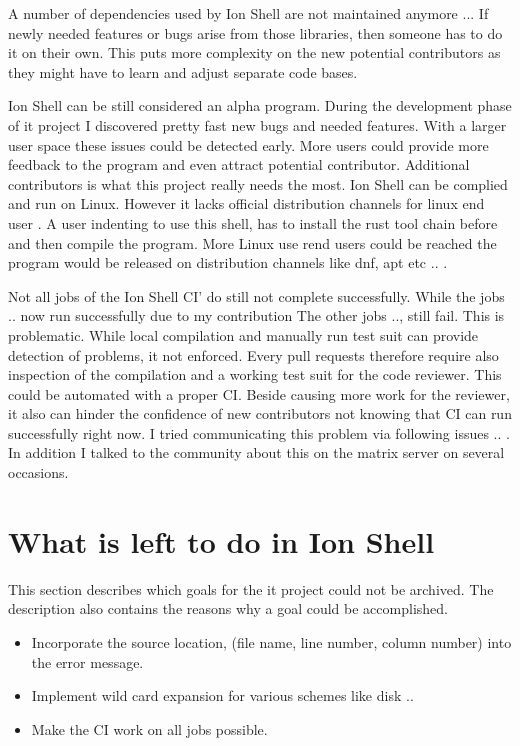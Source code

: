 A number of dependencies used by Ion Shell are not maintained anymore ...
If newly needed features or bugs arise from those libraries, then someone has to do it on their own.
This puts more complexity on the new potential contributors as they might have to learn and adjust separate code bases.

\itemIonShellDistribution

Ion Shell can be still considered an alpha program.
During the development phase of it project I discovered pretty fast new bugs and needed features.
With a larger user space these issues could be detected early.
More users could provide more feedback to the program and even attract potential contributor.
Additional contributors is what this project really needs the most.
Ion Shell can be complied and run on Linux.
However it lacks official distribution channels for linux end user .
A user indenting to use this shell, has to install the rust tool chain before and then compile the program.
More Linux use rend users could be reached the program would be released on distribution channels like dnf, apt etc .. .

\itemIonShellCI

Not all jobs of the Ion Shell CI' do still not complete successfully.
While the jobs .. now run successfully due to my contribution
The other jobs .., still fail.
This is problematic. While local compilation and manually run test suit can provide detection of problems, it not enforced.
Every pull requests therefore require also inspection of the compilation and a working test suit for the code reviewer.
This could be automated with a proper CI.
Beside causing more work for the reviewer, it also can hinder the confidence of new contributors not knowing that CI can run successfully right now.
I tried communicating this problem via following issues .. .
In addition I talked to the community about this on the matrix server on several occasions.


\section{What is left to do in Ion Shell}

This section describes which goals for the it project could not be archived.
The description also contains the reasons why a goal could be accomplished.

\begin{itemize}
	\item Incorporate the source location, (file name, line number, column number) into the error message.
	\item Implement wild card expansion for various schemes like disk ..
	\item Make the CI work on all jobs possible.
\end{itemize}

